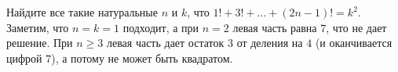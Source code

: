 \problem
Найдите все такие натуральные $n$ и $k$, что
$1! + 3! + \ldots + (2 n - 1)! = k^2$.
\solution
Заметим, что $n = k = 1$ подходит, а при $n = 2$ левая часть равна $7$,
что не дает решение.
При $n \geq 3$ левая часть дает остаток $3$ от деления на $4$ (и оканчивается
цифрой $7$), а потому не может быть квадратом.
\endproblem
